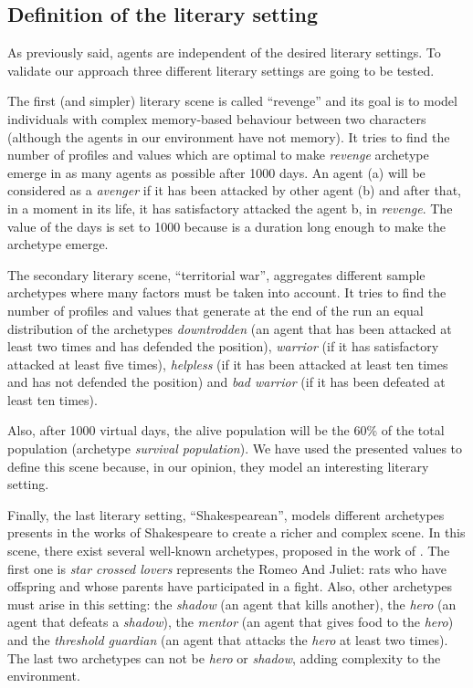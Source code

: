 \documentclass[letterpaper]{article}
\begin{document}
\subsection{Definition of the literary setting}

As previously said, agents are independent of the desired literary settings. To validate our approach three different literary settings are going to be tested.

The first (and simpler) literary scene is called ``revenge'' and its goal is to model individuals with complex memory-based behaviour between two characters (although the agents in our environment have not memory). It tries to find the number of profiles and values which are optimal to make \textit{revenge} archetype emerge in as many agents as possible after 1000 days.  An agent (a) will be considered as a \textit{avenger} if it has been attacked by other agent (b) and after that, in a moment in its life, it has satisfactory attacked the agent b, in \textit{revenge}. The value of the days is set to 1000 because is a duration long enough to make the archetype emerge. 

The secondary literary scene, ``territorial war'', aggregates different sample archetypes where many factors must be taken into account.  It tries to find the number of profiles and values that generate at the end of the run an equal distribution of the archetypes \textit{downtrodden} (an agent that has been attacked at least two times and has defended the position), \textit{warrior} (if it has satisfactory attacked at least five times), \textit{helpless} (if it has been attacked at least ten times and has not defended the position) and \textit{bad warrior} (if it has been defeated at least ten times).

 Also,  after 1000 virtual days, the alive population will be the 60\% of the total population (archetype \textit{survival population}). We have used the presented values to define this scene because, in our opinion, they model an interesting literary setting. 

Finally, the last literary setting, ``Shakespearean'', models different archetypes presents in the works of Shakespeare to create a richer and complex scene. In this scene, there exist several well-known archetypes, proposed in the work of \cite{vogler1998writer}. The first one is \textit{star crossed lovers} represents the Romeo And Juliet: rats who have offspring and whose parents have participated in a fight. Also, other archetypes must arise in this setting: the \textit{shadow} (an agent that kills another), the \textit{hero} (an agent that defeats a \textit{shadow}), the \textit{mentor} (an agent that gives food to the \textit{hero}) and the \textit{threshold guardian} (an agent that attacks the \textit{hero} at least two times). The last two archetypes can not be \textit{hero} or \textit{shadow}, adding complexity to the environment.
\end{document}

